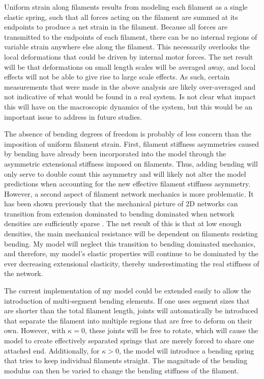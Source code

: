 Uniform strain along filaments results from modeling each filament as a single elastic spring, such that all forces acting on the filament are summed at its endpoints to produce a net strain in the filament.  Because all forces are transmitted to the endpoints of each filament, there can be no internal regions of variable strain anywhere else along the filament.  This necessarily overlooks the local deformations that could be driven by internal motor forces.  The net result will be that deformations on small length scales will be averaged away, and local effects will not be able to give rise to large scale effects.  As such, certain measurements that were made in the above analysis are likely over-averaged and not indicative of what would be found in a real system.  Is not clear what impact this will have on the macroscopic dynamics of the system, but this would be an important issue to address in future studies.

The absence of bending degrees of freedom is probably of less concern than the imposition of uniform filament strain. First, filament stiffness asymmetries caused by bending have already been incorporated into the model through the asymmetric extensional stiffness imposed on filaments.  Thus, adding bending will only serve to double count this asymmetry and will likely not alter the model predictions when accounting for the new effective filament stiffness asymmetry. However, a second aspect of filament network mechanics is more problematic.  It has been shown previously that the mechanical picture of 2D networks can transition from extension dominated to bending dominated when network densities are sufficiently sparse \cite{PhysRevE.68.061907}.  The net result of this is that at low enough densities, the main mechanical resistance will be dependent on filaments resisting bending.  My model will neglect this transition to bending dominated mechanics, and therefore, my model's elastic properties will continue to be dominated by the ever decreasing extensional elasticity, thereby underestimating the real stiffness of the network. 

The current implementation of my model could be extended easily to allow the introduction of multi-segment bending elements.  If one uses segment sizes that are shorter than the total filament length, joints will automatically be introduced that separate the filament into multiple regions that are free to deform on their own.  However, with $\kappa=0$, these joints will be free to rotate, which will cause the model to create effectively separated springs that are merely forced to share one attached end.  Additionally, for $\kappa>0$, the model will introduce a bending spring that tries to keep individual filaments straight.  The magnitude of the bending modulus can then be varied to change the bending stiffness of the filament. 

